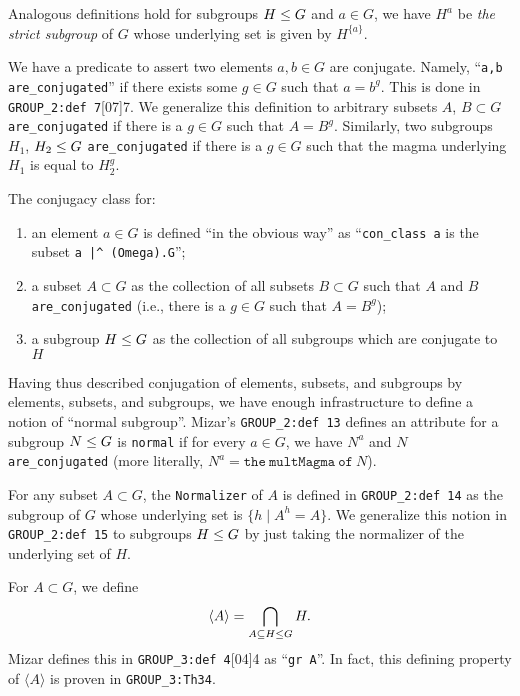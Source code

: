 Analogous definitions hold for subgroups $H\leq G$ and $a\in G$, we
have $H^{a}$ be \emph{the strict subgroup} of $G$ whose underlying set
is given by $H^{\{a\}}$.

We have a predicate to assert two elements $a,b\in G$ are
conjugate. Namely, ``\verb#a,b are_conjugated#'' if there exists some
$g\in G$ such that $a = b^{g}$. This is done in
\verb#GROUP_2:def 7#[07]{7}. We generalize this
definition to arbitrary subsets $A$, $B\subset G$ \verb#are_conjugated# if
there is a $g\in G$ such that $A = B^{g}$. Similarly, two subgroups
$H_{1}$, $H_{2}\leq G$ \verb#are_conjugated# if there is a $g\in G$
such that the magma underlying $H_{1}$ is equal to $H_{2}^{g}$.

The conjugacy class for:
\begin{enumerate}
\item an element $a\in G$ is defined ``in the obvious way''
as ``\texttt{con\_class a}
is the subset \verb#a |^ (Omega).G#'';
\item a subset $A\subset G$ as the collection of all subsets $B\subset G$
such that $A$ and $B$ \verb#are_conjugated# (i.e., there is a $g\in G$
such that $A = B^{g}$);
\item a subgroup $H\leq G$ as the collection of all subgroups which
  are conjugate to $H$
\end{enumerate}

Having thus described conjugation of elements, subsets, and subgroups by
elements, subsets, and subgroups, we have enough infrastructure to
define a notion of ``normal subgroup''. Mizar's
\verb#GROUP_2:def 13# defines an attribute for a subgroup
$N\leq G$ is \verb#normal# if for
every $a\in G$, we have $N^{a}$ and $N$ \verb#are_conjugated# (more
literally, $N^{a} = \mathtt{the~multMagma~of~}N$).

For any subset $A\subset G$, the \verb#Normalizer# of $A$ is defined in
\verb#GROUP_2:def 14# as the subgroup of $G$ whose
underlying set is $\{h \mid A^{h} = A\}$. We generalize this notion in
\verb#GROUP_2:def 15# to subgroups $H\leq G$ by just taking the
normalizer of the underlying set of $H$.

For $A\subset G$, we define
\begin{equation}
\langle A\rangle = \bigcap_{A\subseteq H\leq G} H.
\end{equation}
Mizar defines this in \verb#GROUP_3:def 4#[04]{4} as
``\verb#gr A#''. In fact, this defining
property of $\langle A\rangle$ is proven in
\verb#GROUP_3:Th34#.

